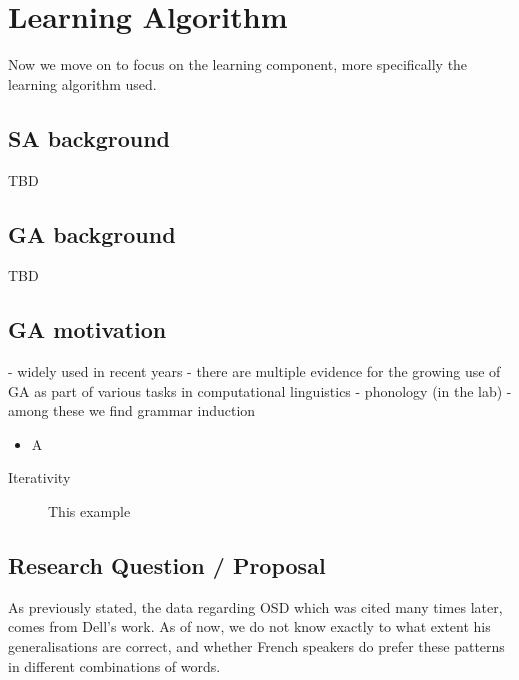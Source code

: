 \documentclass{article}
\begin{document}
\clearpage
\section{Learning Algorithm} 
Now we move on to focus on the learning component, more specifically the learning algorithm used.

\subsection{SA background} %
TBD
\subsection{GA background} %
TBD
\subsection{GA motivation} %
- widely used in recent years
- there are multiple evidence for the growing use of GA as part of various tasks in computational linguistics
- phonology (in the lab)
- among these we find grammar induction

\begin{itemize}
  \item A
\end{itemize}

\begin{description}
   \item[Iterativity] This example
\end{description}

\subsection{Research Question / Proposal} %
As previously stated, the data regarding OSD which was cited many times later, comes from Dell's work. As of now, we do not know exactly to what extent his generalisations are correct, and whether French speakers do prefer these patterns in different combinations of words.
\end{document}
